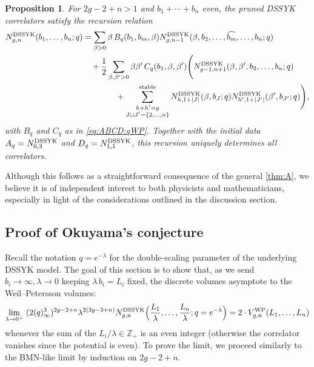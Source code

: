 \documentclass[a4paper,11pt,english]{article}
\theoremstyle{plain}
\newtheorem{proposition}[theorem]{Proposition}
\theoremstyle{definition}
\theoremstyle{plain}
\begin{document}
\begin{proposition}\label{prop:qMir}
    For $2g-2+n > 1$ and $b_1 + \cdots + b_n$ even, the pruned DSSYK correlators satisfy the recursion relation
	\begin{equation}
    \begin{split}
    	N^{\textup{DSSYK}}_{g,n}(b_1,\ldots,b_n;q)
    	&=
    	\sum_{\beta > 0}
    		  \beta \, B_q(b_1,b_m,\beta)
    		  N^{\textup{DSSYK}}_{g,n-1}(\beta,b_2,\dots, \widehat{b_m},\dots, b_n;q) \\
    	& \quad
    	+ \frac{1}{2} \sum_{\beta,\beta' > 0}
    		\beta \beta' \, C_q(b_1,\beta,\beta') \Bigg(
    			N^{\textup{DSSYK}}_{g-1,n+1}(\beta,\beta',b_2,\dots,b_n;q) \\
    	& \qquad\qquad
    			+
    			\sum_{\substack{ h + h' = g \\ J \sqcup J' = \{2,\dots,n\} }}^{\textup{stable}}
    				N^{\textup{DSSYK}}_{h,1+|J|}(\beta,b_{J};q)
    				N^{\textup{DSSYK}}_{h',1+|J'|}(\beta',b_{J'};q)
    	\Bigg),
    \end{split}
    \end{equation}
    with $B_q$ and $C_q$ as in \cref{eq:ABCD:qWP}. Together with the initial data $A_q = N_{0,3}^{\textup{DSSYK}}$ and $D_q = N_{1,1}^{\textup{DSSYK}}$, this recursion uniquely determines all correlators.
\end{proposition}

Although this follows as a straightforward consequence of the general \cref{thm:A}, we believe it is of independent interest to both physicists and mathematicians, especially in light of the considerations outlined in the discussion section.

\subsection{Proof of Okuyama's conjecture}
Recall the notation $q = e^{-\lambda}$ for the double-scaling parameter of the underlying DSSYK model. The goal of this section is to show that, as we send $b_i \rightarrow \infty,\lambda \rightarrow 0$ keeping $\lambda \, b_{i}=L_{i}$ fixed, the discrete volumes asymptote to the Weil--Petersson volumes:
\begin{equation}\label{eq:Oku:conj}
	\lim_{\lambda \to 0^+} \
        (2 (q)_{\infty}^3 )^{2g-2+n}
		\lambda^{2(3g-3+n)}
		N_{g,n}^{\textup{DSSYK}}\Bigl(
            \frac{L_1}{\lambda},\ldots,\frac{L_n}{\lambda};q=e^{-\lambda}
        \Bigr)
	=
	2 \cdot V^{\textup{WP}}_{g,n}(L_1,\ldots,L_{n})
\end{equation}
whenever the sum of the $L_i/\lambda \in \mathbb{Z}_{+}$ is an even integer (otherwise the correlator vanishes since the potential is even). To prove the limit, we proceed similarly to the BMN-like limit by induction on $2g-2+n$. 
\end{document}
